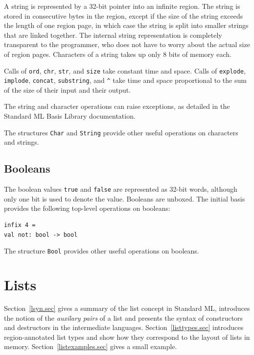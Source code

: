 \documentclass[12pt]{book}
\begin{document}
A string is represented by a 32-bit pointer into an infinite region.
The string is stored in consecutive bytes in the region, except if the
size of the string exceeds the length of one region page, in which
case the string is split into smaller strings that are linked
together. The internal string representation is completely transparent
to the programmer, who does not have to worry about the actual size of
region pages. Characters of a string takes up only 8 bits of
memory each.

Calls of {\tt ord}, {\tt chr}, {\tt str}, and {\tt size} take constant
time and space.  Calls of {\tt explode}, {\tt implode}, {\tt concat},
{\tt substring}, and \verb+^+ take time and space proportional to the
sum of the size of their input and their output.

The string and character operations can raise exceptions, as detailed in the
Standard ML Basis Library documentation.

The structures {\tt Char} and {\tt String} provide other useful
operations on characters and strings.

\section{Booleans}
The boolean values {\tt true} and {\tt false} are represented as
32-bit words, although only one bit is used to denote the value.
Booleans are unboxed. The 
%
initial basis provides the following top-level operations on
booleans:
%
%
\begin{verbatim}
infix 4 =
val not: bool -> bool
\end{verbatim}
The structure {\tt Bool} provides other useful operations on booleans.

%
\chapter{Lists}
\label{lists.sec}
%
Section~\ref{lsyn.sec} gives
a summary of the list concept in Standard ML, introduces
the notion of the {\em auxilary pairs} of a list and presents the
syntax of constructors and destructors in the intermediate languages.
Section~\ref{listtypes.sec} introduces region-annotated list types and
show how they correspond to the layout of lists in memory. 
Section~\ref{listexamples.sec} gives a small example.
\end{document}
